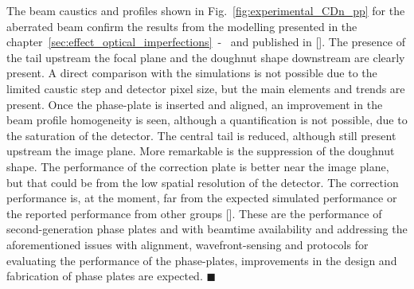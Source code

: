 \begin{refsection}
The beam caustics and profiles shown in Fig.~\ref{fig:experimental_CDn_pp} for the aberrated beam confirm the results from the modelling presented in the chapter~\ref{sec:effect_optical_imperfections}~-~\textit{} and published in [\cite{Celestre2020}]. The presence of the tail upstream the focal plane and the doughnut shape downstream are clearly present. A direct comparison with the simulations is not possible due to the limited caustic step and detector pixel size, but the main elements and trends are present. Once the phase-plate is inserted and aligned, an improvement in the beam profile homogeneity is seen, although a quantification is not possible, due to the saturation of the detector. The central tail is reduced, although still present upstream the image plane. More remarkable is the suppression of the doughnut shape. The performance of the correction plate is better near the image plane, but that could be from the low spatial resolution of the detector. The correction performance is, at the moment, far from the expected simulated performance or the reported performance from other groups [\cite{Seiboth2017,Seiboth2018,Seiboth2020,Dhamgaye2020}]. These are the performance of second-generation phase plates and with beamtime availability and addressing the aforementioned issues with alignment, wavefront-sensing and protocols for evaluating the performance of the phase-plates, improvements in the design and fabrication of phase plates are expected.  $\blacksquare$

\printbibliography[heading=subbibliography]
\end{refsection}
